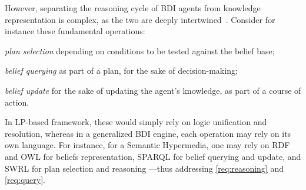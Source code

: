 \documentclass[
]{ceurart}
\begin{document}
However,
separating the reasoning cycle of \ac{BDI} agents from knowledge representation is complex,
as the two are deeply intertwined~\cite{DBLP:conf/dalt/MoreiraVBH05}.
%
Consider for instance these fundamental operations:
%
\begin{inlinelist} 
  \item \emph{plan selection} 
  depending on conditions to be tested against the belief base;

  \item \emph{belief querying} 
  as part of a plan, for the sake of decision-making;

  \item \emph{belief update} 
  for the sake of updating the agent's knowledge, 
  as part of a course of action.
\end{inlinelist}
%
In \ac{LP}-based framework,
these would simply rely on logic unification and resolution,
whereas in a generalized \ac{BDI} engine,
each operation may rely on its own language.
%
For instance,
for a Semantic Hypermedia, 
one may rely on \ac{RDF} and \ac{OWL} for beliefs representation,
\acs{SPARQL} for belief querying and update,
and \ac{SWRL} for plan selection and reasoning%
%
---thus addressing \ref{req:reasoning} and \ref{req:query}. 
\end{document}
